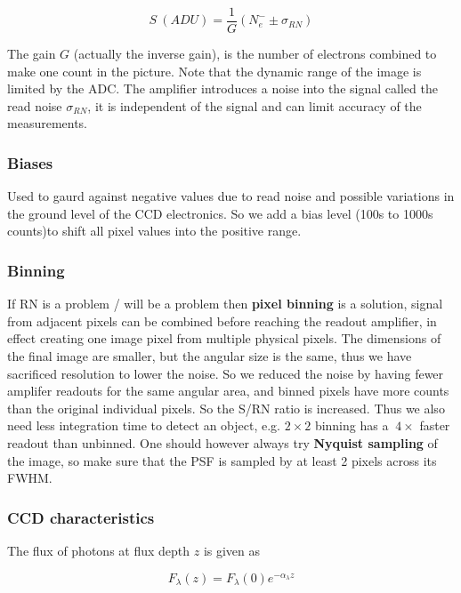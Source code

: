 \documentclass[a4paper]{article}
\begin{document}
\begin{equation*}
    S\ (ADU)=\frac{1}{G}(N_e^{-}\pm\sigma_{RN})
\end{equation*}

The gain $G$ (actually the inverse gain), is the number of electrons combined to make one count in the picture. Note that the dynamic range of the image is limited by the ADC. The amplifier introduces a noise into the signal called the read noise $\sigma_{RN}$, it is independent of the signal and can limit accuracy of the measurements.

\subsubsection*{Biases}

Used to gaurd against negative values due to read noise and possible variations in the ground level of the CCD electronics. So we add a bias level (100s to 1000s counts)to shift all pixel values into the positive range. 

\subsubsection*{Binning} 

If RN is a problem / will be a problem then \textbf{pixel binning} is a solution, signal from adjacent pixels can be combined before reaching the readout amplifier, in effect creating one image pixel from multiple physical pixels. The dimensions of the final image are smaller, but the angular size is the same, thus we have sacrificed resolution to lower the noise. So we reduced the noise by having fewer amplifer readouts for the same angular area, and binned pixels have more counts than the original individual pixels. So the S/RN ratio is increased. Thus we also need less integration time to detect an object, e.g. $2\times 2$ binning has a $~4\times$ faster readout than unbinned. One should however always try \textbf{Nyquist sampling} of the image, so make sure that the PSF is sampled by at least 2 pixels across its FWHM. 

\subsubsection*{CCD characteristics}

The flux of photons at flux depth $z$ is given as

\begin{equation*}
    F_\lambda(z)=F_\lambda(0)e^{-\alpha_\lambda z}
\end{equation*}
\end{document}
